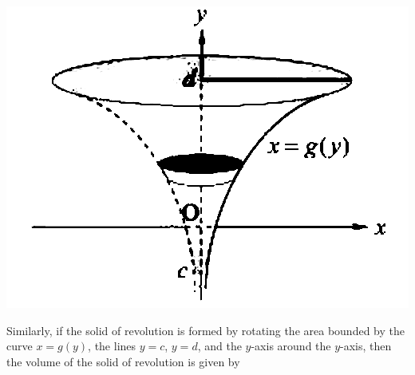 \begin{center}
    \includegraphics[scale=0.3]{assets/28-23.png}
\end{center}

Similarly, if the solid of revolution is formed by rotating the area bounded by
the curve $x = g(y)$, the lines $y = c$, $y = d$, and the $y$-axis around the
$y$-axis, then the volume of the solid of revolution is given by
\begin{center}
\end{center}

\newpage



